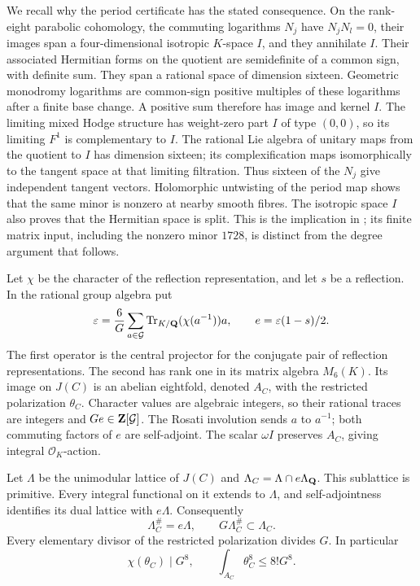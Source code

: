 We recall why the period certificate has the stated consequence. On the
rank-eight parabolic cohomology, the commuting logarithms $N_j$ have
$N_jN_l=0$, their images span a four-dimensional isotropic $K$-space
$I$, and they annihilate $I$. Their associated Hermitian forms on the
quotient are semidefinite of a common sign, with definite sum. They span
a rational space of dimension sixteen. Geometric monodromy logarithms
are common-sign positive multiples of these logarithms after a finite
base change. A positive sum therefore has image and kernel $I$. The
limiting mixed Hodge structure has weight-zero part $I$ of type $(0,0)$,
so its limiting $F^1$ is complementary to $I$. The rational Lie algebra
of unitary maps from the quotient to $I$ has dimension sixteen; its
complexification maps isomorphically to the tangent space at that
limiting filtration. Thus sixteen of the $N_j$ give independent tangent
vectors. Holomorphic untwisting of the period map shows that the same
minor is nonzero at nearby smooth fibres. The isotropic space $I$ also
proves that the Hermitian space is split. This is the implication in
\cite[Lemmas~8.2--8.4 and Proposition~8.5]{Severn}; its finite matrix
input, including the nonzero minor $1728$, is distinct from the degree
argument that follows.

Let $\chi$ be the character of the reflection representation, and let
$s$ be a reflection. In the rational group algebra put
\[
 \varepsilon=\frac6G\sum_{a\in\mathcal G}
       \operatorname{Tr}_{K/\mathbf Q}(\chi(a^{-1}))a,
 \qquad e=\varepsilon(1-s)/2.
\]
The first operator is the central projector for the conjugate pair of
reflection representations. The second has rank one in its matrix
algebra $M_6(K)$. Its image on $J(C)$ is an abelian eightfold, denoted
$A_C$, with the restricted polarization $\theta_C$. Character values
are algebraic integers, so their rational traces are integers and
$Ge\in\mathbf Z[\mathcal G]$. The Rosati involution sends $a$ to $a^{-1}$;
both commuting factors of $e$ are self-adjoint. The scalar $\omega I$
preserves $A_C$, giving integral $\mathcal O_K$-action.

Let $\Lambda$ be the unimodular lattice of $J(C)$ and
$\Lambda_C=\Lambda\cap e\Lambda_\mathbf Q$. This sublattice is primitive.
Every integral functional on it extends to $\Lambda$, and
self-adjointness identifies its dual lattice with $e\Lambda$.
Consequently
\[
 \Lambda_C^{\#}=e\Lambda,\qquad
 G\Lambda_C^{\#}\subset\Lambda_C.
\]
Every elementary divisor of the restricted polarization divides $G$.
In particular
\begin{equation}\label{eq:eis-source-volume}
 \chi(\theta_C)\mid G^8,
 \qquad \int_{A_C}\theta_C^8\le8!G^8.
\end{equation}

